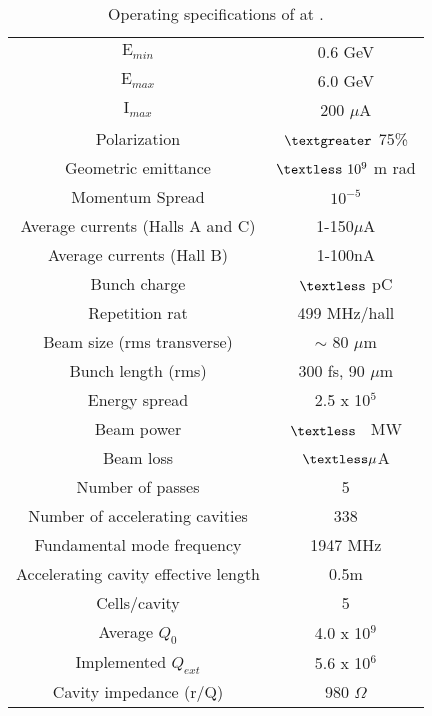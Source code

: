 \begin{table}
\begin{minipage}{\textwidth}
\begin{center}
\begin{singlespacing}

\caption[ Operating Specifications]{\label{tab:cebafspecs}Operating specifications of  at .\cite{cebaf}}

\begin{tabular}{c|c}

%


\hline

$\textrm{E}_{min}$ & 0.6 GeV \\
$\textrm{E}_{max}$ & 6.0 GeV \\
$\textrm{I}_{max}$ & 200 $\mu$A \\
Polarization & $\textgreater$ 75\% \\
Geometric emittance & $\textless \ 10^{9}$ m rad \\
Momentum Spread & $10^{-5}$ \\
Average currents (Halls A and C) & 1-150$\mu$A \\
Average currents (Hall B) & 1-100nA \\
Bunch charge & $\textless$ pC \\
Repetition rat & 499 MHz/hall \\ 
Beam size (rms transverse) & $\sim$ 80 $\mu$m \\
Bunch length (rms) & 300 fs, 90 $\mu$m \\
Energy spread & 2.5 x 10$^5$ \\
Beam power & $\textless$ \ MW  \\
Beam loss & $\textless \mu$A  \\
Number of passes & 5 \\
Number of accelerating cavities & 338 \\
Fundamental mode frequency & 1947 MHz \\
Accelerating cavity effective length & 0.5m \\
Cells/cavity  & 5\\
Average $Q_{0}$  & 4.0 x 10$^9$ \\
Implemented $Q_{ext}$  & 5.6 x 10$^6$ \\
Cavity impedance (r/Q)  & 980 $\Omega$ \\

\end{tabular}
\end{singlespacing}
\end{center}
\end{minipage}
\end{table}
